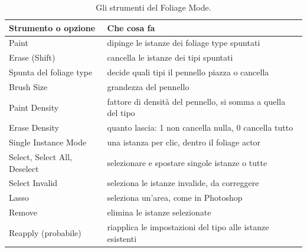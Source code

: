 \begin{table}[htbp]
\centering
\small
\begin{tabular}{@{}p{4.0cm}p{10.0cm}@{}}
\toprule
\textbf{Strumento o opzione} & \textbf{Che cosa fa} \\
\midrule
Paint & dipinge le istanze dei foliage type spuntati \\
Erase (Shift) & cancella le istanze dei tipi spuntati \\
Spunta del foliage type & decide quali tipi il pennello piazza o cancella \\
Brush Size & grandezza del pennello \\
Paint Density & fattore di densità del pennello, si somma a quella del tipo \\
Erase Density & quanto lascia: 1 non cancella nulla, 0 cancella tutto \\
Single Instance Mode & una istanza per clic, dentro il foliage actor \\
Select, Select All, Deselect & selezionare e spostare singole istanze o tutte \\
Select Invalid & seleziona le istanze invalide, da correggere \\
Lasso & seleziona un'area, come in Photoshop \\
Remove & elimina le istanze selezionate \\
Reapply (probabile) & riapplica le impostazioni del tipo alle istanze esistenti \\
\bottomrule
\end{tabular}
\caption{Gli strumenti del Foliage Mode.}
\label{ue15:tab:strumentifoliage}
\end{table}

